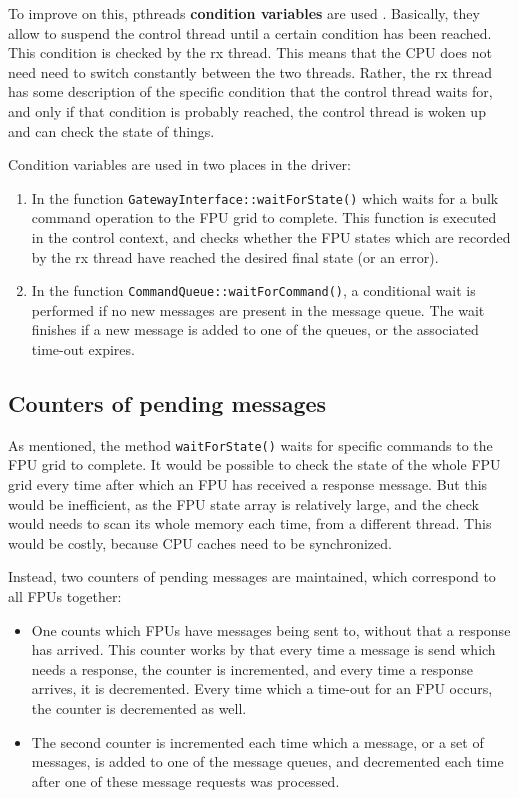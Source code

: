 \documentclass[fontsize=12,a4paper]{scrartcl}
\begin{document}
To improve on this, pthreads \textbf{condition variables} are used \cite[section 3.3, p70]{Butenhof:PwPT} \cite[chapter 4]{Williams:CppConcurrency}.
Basically, they allow to suspend the control thread until a certain
condition has been reached. This condition is checked by the rx
thread. This means that the CPU does not need need to switch
constantly between the two threads. Rather, the rx thread has some
description of the specific condition that the control thread waits
for, and only if that condition is probably reached, the control
thread is woken up and can check the state of things.

Condition variables are used in two places in the driver:

\begin{enumerate}
\item In the function \texttt{GatewayInterface::waitForState()} which
  waits for a bulk command operation to the
  FPU grid to complete. This function is executed
  in the control context, and checks whether the FPU
  states which are recorded by the rx thread have
  reached the desired final state (or an error).
\item In the function \texttt{CommandQueue::waitForCommand()}, a
  conditional wait is performed if no new messages are present in the
  message queue. The wait finishes if a new message is added to one of
  the queues, or the associated time-out expires.
  
\end{enumerate}


\subsection{Counters of pending messages}

As mentioned, the method \texttt{waitForState()} waits for specific
commands to the FPU grid to complete.  It would be possible to check
the state of the whole FPU grid every time after which an FPU has
received a response message. But this would be inefficient, as the FPU
state array is relatively large, and the check would needs to scan its
whole memory each time, from a different thread. This would be costly,
because CPU caches need to be synchronized.

Instead, two counters of pending messages are maintained, which
correspond to all FPUs together:

\begin{itemize}
\item One counts which FPUs have messages being sent to, without that
  a response has arrived. This counter works by that every time a
  message is send which needs a response, the counter is incremented,
  and every time a response arrives, it is decremented. Every time
  which a time-out for an FPU occurs, the counter is decremented as
  well.
\item The second counter is incremented each time which a message,
  or a set of messages, is added to one of the message queues,
  and decremented each time after one of these
  message requests was processed.
\end{itemize}
\end{document}

